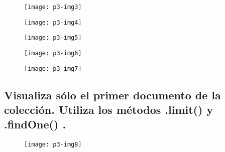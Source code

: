 \documentclass[10pt]{article}
\begin{document}
 \begin{figure}[H]
	\begin{center}
 		\texttt{[image: p3-img3]}
	\end{center} 
\end{figure}

 \begin{figure}[H]
	\begin{center}
 		\texttt{[image: p3-img4]}
	\end{center} 
\end{figure}

 \begin{figure}[H]
	\begin{center}
 		\texttt{[image: p3-img5]}
	\end{center} 
\end{figure}

 \begin{figure}[H]
	\begin{center}
 		\texttt{[image: p3-img6]}
	\end{center} 
\end{figure}

 \begin{figure}[H]
	\begin{center}
 		\texttt{[image: p3-img7]}
	\end{center} 
\end{figure}


\vspace{4cm}
\subsection{Visualiza sólo el primer documento de la colección. Utiliza los métodos \textbf{.limit()} y \textbf{.findOne()} .} 

 \begin{figure}[H]
	\begin{center}
 		\texttt{[image: p3-img8]}
	\end{center} 
\end{figure}
\end{document}
